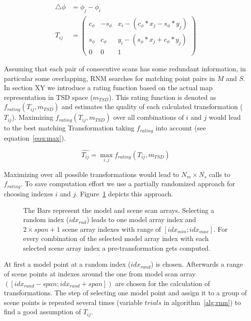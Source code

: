 \documentclass[conference]{IEEEtran}
\begin{document}
\begin{align}
\label{equ:tij}
\bigtriangleup \phi &= \phi_j - \phi_i \nonumber\\ 
T_{ij} &=
\begin{pmatrix}
c_\phi & -s_\phi & x_i - (c_\phi * x_j - s_\phi * y_j)\\
s_\phi &  c_\phi & y_i - (s_\phi * x_j + c_\phi * y_j)\\
0 & 0 & 1
\end{pmatrix}
\end{align}


Assuming that each pair of consecutive scans has some redundant information, in particular some overlapping, RNM searches for matching point pairs in $M$ and $S$. In section XY we introduce a rating function based on the actual map representation in TSD space ($m_{TSD}$). This rating function is denoted as $f_{rating}(T_{ij},m_{TSD})$ and estimates the quality of each calculated transformation ($T_{ij}$). Maximizing $f_{rating}(T_{ij},m_{TSD})$ over all combinations of $i$ and $j$ would lead to the best matching Transformation taking $f_{rating}$ into account (see equation~\ref{equ:max}).

\begin{equation}
\label{equ:max}
\widehat{T_{ij}} = \max_{i,j} f_{rating}(T_{ij},m_{TSD})
\end{equation}

Maximizing over all possible transformations would lead to $N_m \times N_s$ calls to $f_{rating}$. To save computation effort we use a partially randomized approach for choosing indexes $i$ and $j$. Figure~\ref{fig:span} depicts this approach. 

\begin{figure}[htb] 
	\centering 
	\def\svgwidth{200pt} 
	  
	\caption{The Bars represent the model and scene scan arrays. Selecting a random index ($idx_{rnd}$) leads to one model array index and $2\times span + 1$ scene array indexes with range of $[idx_{min}; idx_{max}]$. For every combination of the selected model array index with each selected scene array index a pre-transformation gets computed.} 
	\label{fig:span}
\end{figure}

At first a model point at a random index ($idx_{rand}$) is chosen. Afterwards a range of scene points at indexes around the one from model scan array $\left([idx_{rand}-span; idx_{rand}+span]\right)$ are chosen for the calculation of transformations. The step of selecting one model point and assign it to a group of scene points is repeated several times (variable $trials$ in algorithm~\ref{alg:rnm}) to find a good assumption of $T_{ij}$. 
\end{document}
